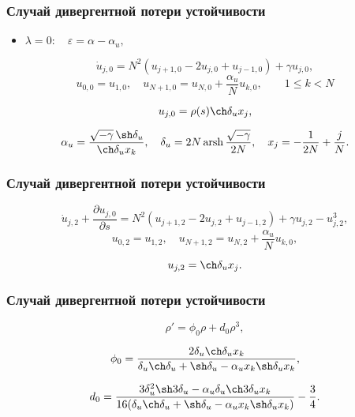 \documentclass[fullscreen=true, unicode, bookmarks=false]{beamer}
\DeclareMathOperator{\arsh}{arsh}
\begin{document}
\begin{frame}
\frametitle{ Случай дивергентной потери устойчивости }

\begin{itemize}
\item { $ \lambda = 0: \quad \varepsilon=\alpha-\alpha_u, $
}
\end{itemize}

\bigskip

\begin{equation}
	\dot u_{j,0} = N^2(u_{j+1,0} - 2u_{j,0} + u_{j-1,0}) + \gamma u_{j,0},
\end{equation}
\begin{equation}
	u_{0,0} = u_{1,0}, \quad u_{N+1,0} = u_{N,0} + \dfrac{\alpha_u}{N}u_{k,0}, \qquad 1 \le k < N
\end{equation}

\bigskip

$$ u_{j,0} = \rho(s) \ch \delta_u x_j, $$

\bigskip

$$ \alpha_u = \frac{ \sqrt{-\gamma} \, \sh \delta_u }{ \ch\delta_u x_k }, \quad \delta_u = 2N \arsh \dfrac{\sqrt{-\gamma}}{2N}, \quad x_j = -\dfrac{1}{2N} + \dfrac{j}{N}. $$

\end{frame}

\begin{frame}
\frametitle{ Случай дивергентной потери устойчивости }

\begin{equation}
	\dot u_{j,2} + \frac{\partial u_{j,0}}{\partial s} = N^2(u_{j+1,2} - 2u_{j,2} + u_{j-1,2}) + \gamma u_{j,2} - u_{j,2}^3,
\end{equation}
\begin{equation}
	u_{0,2} = u_{1,2}, \quad u_{N+1,2} = u_{N,2} + \dfrac{\alpha_u}{N}u_{k,0},
\end{equation}

\bigskip

$$ u_{j,2} = \ch \delta_u x_j. $$

\end{frame}

\begin{frame}
\frametitle{ Случай дивергентной потери устойчивости }

\begin{equation}
	\rho' = \phi_0 \rho + d_0 \rho^3,
\end{equation}

\bigskip

\begin{equation}\label{phi0_div}
\phi_0 = \frac{ 2 \delta_u \ch \delta_u x_k }{ \delta_u \ch \delta_u +\sh \delta_u - \alpha_u x_k \sh \delta_u x_k },
\end{equation}

\begin{equation}\label{d0_div}
d_0 = \frac{ 3\delta_u^2 \sh 3\delta_u - \alpha_u \delta_u \ch 3\delta_u x_k }{ 16( \delta_u \ch \delta_u +\sh \delta_u - \alpha_u x_k \sh \delta_u x_k ) } - \frac{3}{4}.
\end{equation}

\end{frame}
\end{document}
